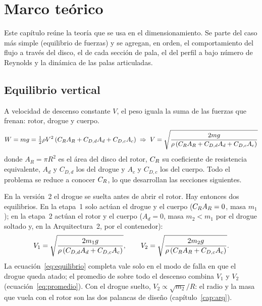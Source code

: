 \chapter{Marco teórico}\label{cap:teoria}

Este capítulo reúne la teoría que se usa en el dimensionamiento. Se parte del caso más
simple (equilibrio de fuerzas) y se agregan, en orden, el comportamiento del flujo a
través del disco, el de cada sección de pala, el del perfil a bajo número de Reynolds y
la dinámica de las palas articuladas.

\section{Equilibrio vertical}
A velocidad de descenso constante $V$, el peso iguala la suma de las fuerzas que frenan:
rotor, drogue y cuerpo.
\begin{equation}
  W = m g = \tfrac12 \rho V^2 \left( C_{R} A_R + C_{D,d} A_d + C_{D,c} A_c \right)
  \;\Rightarrow\;
  V = \sqrt{\dfrac{2 m g}{\rho \left( C_{R} A_R + C_{D,d} A_d + C_{D,c} A_c\right)}}
  \label{eq:equilibrio}
\end{equation}
donde $A_R=\pi R^2$ es el área del disco del rotor, $C_{R}$ su coeficiente de resistencia
equivalente, $A_d$ y $C_{D,d}$ los del drogue y $A_c$ y $C_{D,c}$ los del cuerpo. Todo el
problema se reduce a conocer $C_{R}$, lo que desarrollan las secciones siguientes.

En la versión~2 el drogue se suelta antes de abrir el rotor. Hay entonces dos equilibrios. En la
etapa~1 solo actúan el drogue y el cuerpo ($C_{R} A_R=0$, masa $m_1$); en la etapa~2 actúan el rotor y el cuerpo ($A_d=0$,
masa $m_2<m_1$ por el drogue soltado y, en la Arquitectura~2, por el contenedor):
\begin{equation}
  V_1=\sqrt{\dfrac{2 m_1 g}{\rho\left(C_{D,d} A_d + C_{D,c} A_c\right)}},\qquad
  V_2=\sqrt{\dfrac{2 m_2 g}{\rho\left(C_{R} A_R + C_{D,c} A_c\right)}}.
  \label{eq:equilibrio-dos}
\end{equation}
La ecuación~\eqref{eq:equilibrio} completa vale solo en el modo de falla en que el drogue
queda atado; el promedio de  sobre todo el descenso combina $V_1$ y $V_2$
(ecuación~\ref{eq:promedio}). Con el drogue suelto, $V_2\propto\sqrt{m_2}/R$: el radio y la masa
que vuela con el rotor son las dos palancas de diseño (capítulo~\ref{cap:arq}).

